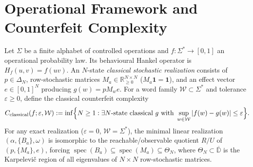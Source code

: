 \documentclass[11pt]{article}
\theoremstyle{definition}
\newcommand{\R}{\mathbb{R}}
\newcommand{\D}{\mathbb{D}}
\newcommand{\eps}{\varepsilon}
\newcommand{\Spec}{\operatorname{spec}}
\begin{document}
\begin{abstract}
\begin{enumerate}
\item \textbf{Non-asymptotic fixed-rank and rank-unrestricted finite-shot certificates (unary \& multi-symbol):} under exact rank $r$, Hankel Matrix Hoeffding plus exact similarity elimination and Schur-complement block isolation certifies $N_{\mathrm{cl}}\ge 17$ (baseline) and $N_{\mathrm{cl}}\ge 21$ (golden angle) at $300\text{k}$ shots/word ($\alpha=0.01$). Eliminating the rank cap entirely, a \emph{B-spline Cayley--Hamilton obstruction} coupled to a \emph{subharmonic dual certificate} certifies $N_{\mathrm{cl}}\ge 8$ at unary horizon $L=4000$ ($200\text{k}$ shots) and $N_{\mathrm{cl}}\ge 9$ at $L=320$ ($64.2\text{M}$ shots). Extending to multi-symbol alphabets $\Sigma=\{x,z\}$ (ANANKE v4), we prove: (i) a Kochen--Specker linear-witness ceiling $\langle W,H_f\rangle/\gamma_+(W)\le 4$ on single qubits (with explicit $9/4$ and icosahedral $2.292$ witnesses exceeding $2$); (ii) a non-convex eliminated-effect support-envelope obstruction with directed-rounding box-scaled secant branch-and-bound certifying $N_{\mathrm{cl}}\ge 8$ on a pure qubit at depth $L=8$ ($15.33\text{M}$ shots, $20\times$ shallower than v3); (iii) noncommutative semigroup synergy via Niven's theorem ($R_x(\pi/2),R_z(\pi/3)\implies \cos\theta_{xz}=-1/4$), certifying $N_{\mathrm{cl}}\ge 7>\max(4,6)$ in $120.1\text{k}$ shots; and (iv) unconditional short-depth Weyl + Matrix Hoeffding bounds certifying $N_{\mathrm{cl}}\ge 9,16,25$ on $d=3,4,5$ qudits at $L=6,8,10$ ($63.5\text{k}$--$1.23\text{M}$ shots).
\end{enumerate}
\end{abstract}

\section{Operational Framework and Counterfeit Complexity}

Let $\Sigma$ be a finite alphabet of controlled operations and $f:\Sigma^*\to[0,1]$ an operational probability law. Its behavioural Hankel operator is $H_f(u,v)=f(uv)$. An $N$-state \emph{classical stochastic realization} consists of $p\in\Delta_N$, row-stochastic matrices $M_a\in\R_{\ge0}^{N\times N}$ ($M_a\mathbf{1}=\mathbf{1}$), and an effect vector $e\in[0,1]^N$ producing $g(w)=pM_w e$. For a word family $\mathcal{W}\subset\Sigma^*$ and tolerance $\eps\ge 0$, define the classical counterfeit complexity
\[
 C_{\mathrm{classical}}(f;\eps,\mathcal{W})
 := \inf\Bigl\{N\ge 1 : \exists N\text{-state classical } g \text{ with } \sup_{w\in\mathcal{W}}|f(w)-g(w)|\le\eps\Bigr\}.
\]
For any exact realization ($\eps=0$, $\mathcal{W}=\Sigma^*$), the minimal linear realization $(\alpha,\{B_a\},\omega)$ is isomorphic to the reachable/observable quotient $R/U$ of $(p,\{M_a\},e)$, forcing $\Spec(B_a)\subseteq\Spec(M_a)\subseteq\Theta_N$, where $\Theta_N\subset\overline{\D}$ is the Karpelevi\v{c} region of all eigenvalues of $N\times N$ row-stochastic matrices.
\end{document}
